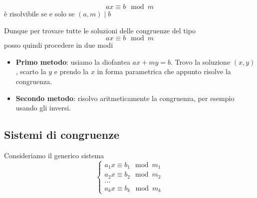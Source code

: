 \begin{theorem}
	\begin{equation*}
		ax \equiv b \mod{m}
	\end{equation*}
	\`e risolvibile se e solo se $(a, m) \mid b$
\end{theorem}

Dunque per trovare tutte le soluzioni delle congruenze del tipo
\begin{equation*}
	ax \equiv b \mod{m}
\end{equation*}
posso quindi procedere in due modi
\begin{itemize}
	\item \textbf{Primo metodo}: usiamo la diofantea $ax + my = b$. Trovo la soluzione $(x, y)$,
	      scarto la $y$ e prendo la $x$ in forma parametrica che appunto risolve la congruenza.
	\item \textbf{Secondo metodo}: risolvo aritmeticamente la congruenza, per esempio usando gli
	      inversi.
\end{itemize}

\subsection{Sistemi di congruenze}
Consideriamo il generico sistema
\begin{equation*}
	\begin{cases}
		a_1 x \equiv b_1 \mod{m_1} \\
		a_2 x \equiv b_2 \mod{m_2} \\
		\dots                      \\
		a_k x \equiv b_k \mod{m_k}
	\end{cases}
\end{equation*}

